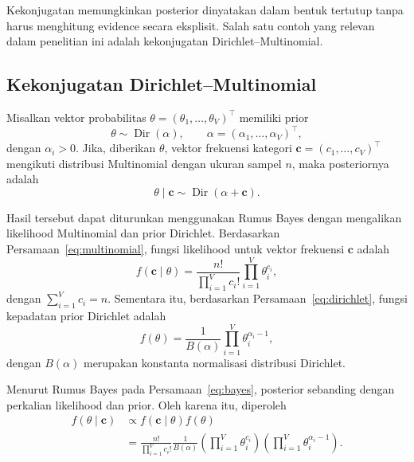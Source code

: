Kekonjugatan memungkinkan posterior dinyatakan dalam bentuk tertutup
tanpa harus menghitung evidence secara eksplisit. Salah satu contoh
yang relevan dalam penelitian ini adalah kekonjugatan Dirichlet--Multinomial.


\subsection{Kekonjugatan Dirichlet--Multinomial}
\label{subsec:konjugasidirichletmultinomial}

\begin{definisi}
\label{def:konjugasidirichletmultinomial}
Misalkan vektor probabilitas
$\theta=(\theta_1,\ldots,\theta_V)^\top$ memiliki prior
\[
\theta\sim\operatorname{Dir}(\alpha),
\qquad
\alpha=(\alpha_1,\ldots,\alpha_V)^\top,
\]
dengan $\alpha_i>0$. Jika, diberikan $\theta$, vektor frekuensi
kategori $\bm{c}=(c_1,\ldots,c_V)^\top$ mengikuti distribusi
Multinomial dengan ukuran sampel $n$, maka posteriornya adalah
\begin{equation}
\theta\mid\bm{c}
\sim\operatorname{Dir}(\alpha+\bm{c}).
\label{eq:konjugasidirichletmultinomial}
\end{equation}
\end{definisi}

Hasil tersebut dapat diturunkan menggunakan Rumus Bayes dengan
mengalikan likelihood Multinomial dan prior Dirichlet. Berdasarkan
Persamaan~\eqref{eq:multinomial}, fungsi likelihood untuk vektor
frekuensi $\bm{c}$ adalah
\begin{equation}
f(\bm{c}\mid\theta)
=
\frac{n!}{\prod_{i=1}^{V}c_i!}
\prod_{i=1}^{V}\theta_i^{c_i},
\label{eq:likelihoodmultinomial}
\end{equation}
dengan $\sum_{i=1}^{V}c_i=n$. Sementara itu, berdasarkan
Persamaan~\eqref{eq:dirichlet}, fungsi kepadatan prior Dirichlet
adalah
\begin{equation}
f(\theta)
=
\frac{1}{B(\alpha)}
\prod_{i=1}^{V}\theta_i^{\alpha_i-1},
\label{eq:priorlengkap}
\end{equation}
dengan $B(\alpha)$ merupakan konstanta normalisasi distribusi
Dirichlet.

Menurut Rumus Bayes pada Persamaan~\eqref{eq:bayes}, posterior
sebanding dengan perkalian likelihood dan prior. Oleh karena itu,
diperoleh
\begin{align}
f(\theta\mid\bm{c})
&\propto f(\bm{c}\mid\theta)f(\theta)
\nonumber\\
&=
\frac{n!}{\prod_{i=1}^{V}c_i!}
\frac{1}{B(\alpha)}
\left(\prod_{i=1}^{V}\theta_i^{c_i}\right)
\left(\prod_{i=1}^{V}\theta_i^{\alpha_i-1}\right).
\label{eq:perkalianlikelihoodprior}
\end{align}

